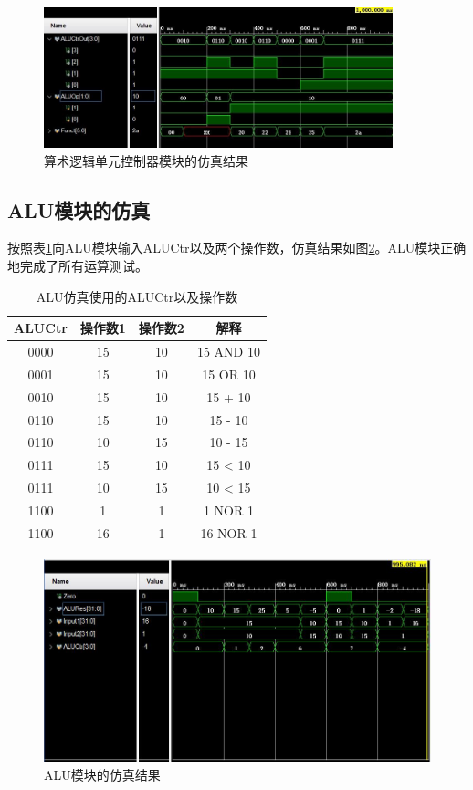 \documentclass[UTF8]{ctexart}
\begin{document}
\begin{figure}[htbp]
    \centering
    \includegraphics[width=0.9\textwidth]{fig-sim-aluctr.jpg}
    \caption{算术逻辑单元控制器模块的仿真结果}
    \label{fig:sim-aluctr}
\end{figure}

\subsection{ALU模块的仿真}
按照表\ref{tab:sim-alu}向ALU模块输入ALUCtr以及两个操作数，仿真结果如图\ref{fig:sim-alu}。ALU模块正确地完成了所有运算测试。
\begin{table}[htbp]
    \centering
    \begin{tabular}{|c|c|c|c|}
    \hline
    ALUCtr & 操作数1 & 操作数2 & 解释 \\ \hline
    0000 & 15 & 10 & 15 AND 10 \\
    0001 & 15 & 10 & 15 OR 10 \\
    0010 & 15 & 10 & 15 + 10 \\
    0110 & 15 & 10 & 15 - 10 \\
    0110 & 10 & 15 & 10 - 15 \\
    0111 & 15 & 10 & 15 < 10 \\
    0111 & 10 & 15 & 10 < 15 \\
    1100 & 1 & 1 & 1 NOR 1 \\
    1100 & 16 & 1 & 16 NOR 1 \\ \hline
    \end{tabular}
    \caption{ALU仿真使用的ALUCtr以及操作数}
    \label{tab:sim-alu}
    \end{table}

\begin{figure}[htbp]
    \centering
    \includegraphics[width=\textwidth]{fig-sim-alu.jpg}
    \caption{ALU模块的仿真结果}
    \label{fig:sim-alu}
\end{figure}
\end{document}
